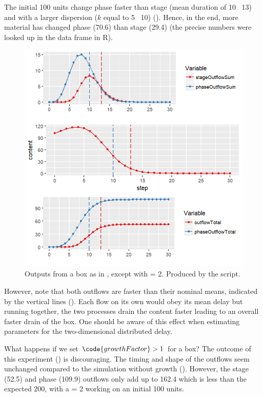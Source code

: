 The initial 100 units change phase faster than stage (mean duration of 10 \vs\ 13) and with a larger dispersion ($k$ equal to 5 \vs\ 10) (). Hence, in the end, more material has changed phase (70.6) than stage (29.4) (the precise numbers were looked up in the  data frame in R). 

\begin{figure} [ht]
\centering
\includegraphics[width=.9\textwidth]{graphics/phys-dev-5}
\caption{Outputs from a  box as in , except with  = 2. Produced by the  script.} 
\label{fig:phys-dev-5}
\end{figure}

However, note that both outflows are faster than their nominal means, indicated by the vertical lines (). Each flow on its own would obey its mean delay but running together, the two processes drain the content faster leading to an overall faster drain of the box. One should be aware of this effect when estimating parameters for the two-dimensional distributed delay.
 
What happens if we set $\code{growthFactor} > 1$ for a  box? The outcome of this experiment () is discouraging. The timing and shape of the outflows seem unchanged compared to the simulation without growth (). However, the stage (52.5) and phase (109.9) outflows only add up to 162.4 which is less than the expected 200, with a  = 2 working on an initial 100 units.

